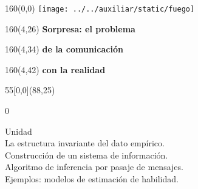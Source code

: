 \documentclass[shownotes,aspectratio=169]{beamer}
\newcounter{capitulo}
\newcommand{\unidad}{\thecapitulo \stepcounter{capitulo}}
\begin{document}
\begin{frame}

\begin{textblock}{160}(0,0)
\texttt{[image: ../../auxiliar/static/fuego]}
\end{textblock}

\begin{textblock}{160}(4,26)
\LARGE \textcolor{black!5}{\fontsize{22}{0}\selectfont \textbf{Sorpresa: el problema}}
\end{textblock}
\begin{textblock}{160}(4,34)
\LARGE \textcolor{black!5}{\fontsize{22}{0}\selectfont \textbf{de la comunicación}}
\end{textblock}
\begin{textblock}{160}(4,42)
\LARGE \textcolor{black!5}{\fontsize{22}{0}\selectfont \textbf{con la realidad}}
\end{textblock}



\begin{textblock}{55}[0,0](88,25)
\begin{turn}{0}
\parbox{7cm}{\sloppy\setlength\parfillskip{0pt}
\textcolor{black!0}{Unidad \unidad} \\
\small\textcolor{black!5}{\hspace{-0.3cm}La estructura invariante del dato empírico.} \\
\small\textcolor{black!5}{\hspace{-0.3cm}Construcción de un sistema de información.}\\
\small\textcolor{black!5}{\hspace{-0.4cm}Algoritmo de inferencia por pasaje de mensajes.} \\
\small\textcolor{black!5}{\hspace{-0.6cm}Ejemplos: modelos de estimación de habilidad.} \\
}
\end{turn}
\end{textblock}

\end{frame}
\end{document}
